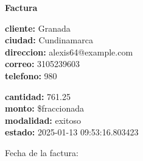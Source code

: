 \documentclass{article}
\begin{document}
\begin{center}
    {\LARGE \textbf{Factura}}\\[1cm]
\end{center}

\textbf{cliente:} Granada \\
\textbf{ciudad:} Cundinamarca \\
\textbf{direccion:} alexis64@example.com \\
\textbf{correo:} 3105239603 \\
\textbf{telefono:} 980 \\

\vspace{0.5cm}

\textbf{cantidad:} 761.25 \\
\textbf{monto:} \$fraccionada \\
\textbf{modalidad:} exitoso \\
\textbf{estado:} 2025-01-13 09:53:16.803423 \\

\vspace{1cm}

Fecha de la factura: 
\end{document}
